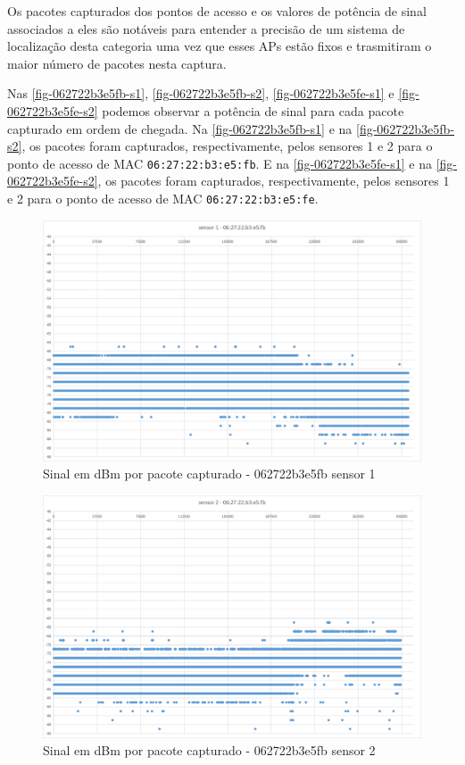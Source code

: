 Os pacotes capturados dos pontos de acesso e os valores de potência de sinal
associados a eles são notáveis para entender a precisão de um sistema de localização
desta categoria uma vez que esses APs estão fixos e trasmitiram o
maior número de pacotes nesta captura.

Nas \autoref{fig-062722b3e5fb-s1}, \autoref{fig-062722b3e5fb-s2},
\autoref{fig-062722b3e5fe-s1} e \autoref{fig-062722b3e5fe-s2} podemos observar
a potência de sinal para cada pacote capturado em ordem de chegada.
Na \autoref{fig-062722b3e5fb-s1} e
na \autoref{fig-062722b3e5fb-s2}, os pacotes
foram capturados, respectivamente, pelos sensores 1 e 2 para o ponto de acesso
de MAC \texttt{06:27:22:b3:e5:fb}. E na
\autoref{fig-062722b3e5fe-s1} e na \autoref{fig-062722b3e5fe-s2}, os pacotes foram capturados, respectivamente, pelos sensores 1 e 2 para
o ponto de acesso de MAC \texttt{06:27:22:b3:e5:fe}.

\begin{figure}[htb]
	\centering
	\caption{\label{fig-062722b3e5fb-s1}Sinal em dBm por pacote capturado - 062722b3e5fb sensor 1}
	\includegraphics[width=1\textwidth]{060-testes/data-analisis/night-run/062722b3e5fb-sensor-01.png}
\end{figure}

\begin{figure}[htb]
	\centering
	\caption{\label{fig-062722b3e5fb-s2}Sinal em dBm por pacote capturado - 062722b3e5fb sensor 2}
	\includegraphics[width=1\textwidth]{060-testes/data-analisis/night-run/062722b3e5fb-sensor-02.png}
\end{figure}

